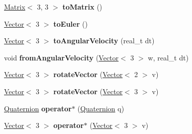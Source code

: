 \begin{DoxyCompactItemize}
\item 
\hypertarget{classetk_1_1_quaternion_a3f6d295725e34994abcc00ea60e19658}{\hyperlink{classetk_1_1_matrix}{Matrix}$<$ 3, 3 $>$ {\bfseries to\-Matrix} ()}\label{classetk_1_1_quaternion_a3f6d295725e34994abcc00ea60e19658}

\item 
\hypertarget{classetk_1_1_quaternion_a81ad691231786ab3a13157bfbc6de1ec}{\hyperlink{classetk_1_1_vector}{Vector}$<$ 3 $>$ {\bfseries to\-Euler} ()}\label{classetk_1_1_quaternion_a81ad691231786ab3a13157bfbc6de1ec}

\item 
\hypertarget{classetk_1_1_quaternion_ae3013c0206fa9af63f3c64bba21abe90}{\hyperlink{classetk_1_1_vector}{Vector}$<$ 3 $>$ {\bfseries to\-Angular\-Velocity} (real\-\_\-t dt)}\label{classetk_1_1_quaternion_ae3013c0206fa9af63f3c64bba21abe90}

\item 
\hypertarget{classetk_1_1_quaternion_a49985a78ae54c08192f9f256c1eec81d}{void {\bfseries from\-Angular\-Velocity} (\hyperlink{classetk_1_1_vector}{Vector}$<$ 3 $>$ w, real\-\_\-t dt)}\label{classetk_1_1_quaternion_a49985a78ae54c08192f9f256c1eec81d}

\item 
\hypertarget{classetk_1_1_quaternion_a8c5bdf49977cb3c9c9e3189b75b224c2}{\hyperlink{classetk_1_1_vector}{Vector}$<$ 3 $>$ {\bfseries rotate\-Vector} (\hyperlink{classetk_1_1_vector}{Vector}$<$ 2 $>$ v)}\label{classetk_1_1_quaternion_a8c5bdf49977cb3c9c9e3189b75b224c2}

\item 
\hypertarget{classetk_1_1_quaternion_afa4cab588a1fdfa2c2ca0e2f60473063}{\hyperlink{classetk_1_1_vector}{Vector}$<$ 3 $>$ {\bfseries rotate\-Vector} (\hyperlink{classetk_1_1_vector}{Vector}$<$ 3 $>$ v)}\label{classetk_1_1_quaternion_afa4cab588a1fdfa2c2ca0e2f60473063}

\item 
\hypertarget{classetk_1_1_quaternion_acfd5de59138eb00b43d5c2633152d72d}{\hyperlink{classetk_1_1_quaternion}{Quaternion} {\bfseries operator$\ast$} (\hyperlink{classetk_1_1_quaternion}{Quaternion} q)}\label{classetk_1_1_quaternion_acfd5de59138eb00b43d5c2633152d72d}

\item 
\hypertarget{classetk_1_1_quaternion_a7ed0b672fabb560607b8260429b3e4af}{\hyperlink{classetk_1_1_vector}{Vector}$<$ 3 $>$ {\bfseries operator$\ast$} (\hyperlink{classetk_1_1_vector}{Vector}$<$ 3 $>$ v)}\label{classetk_1_1_quaternion_a7ed0b672fabb560607b8260429b3e4af}


\end{DoxyCompactItemize}

